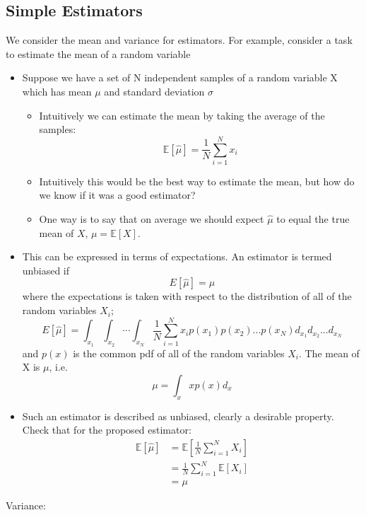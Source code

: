 \documentclass[12pt]{article}
\newcommand{\mexp}{\mathbb{E}}
\begin{document}
\subsection{Simple Estimators}
We consider the mean and variance for estimators. For example, consider a task to estimate the mean of a random variable 
\begin{itemize}
    \item Suppose we have a set of N independent samples of a random variable X which has mean $\mu$ and standard deviation $\sigma$
    \begin{itemize}
        \item Intuitively we can estimate the mean by taking the average of the samples:
        \[
        \mexp[\hat{\mu}] = \frac{1}{N}\sum_{i=1}^N x_i
        \]
        \item Intuitively this would be the best way to estimate the mean, but how do we know if it was a good estimator?
        \item One way is to say that on average we should expect $\hat{\mu}$ to equal the true mean of $X$, $\mu =\mexp[X]$.
    \end{itemize}
    \item This can be expressed in terms of expectations. An estimator is termed unbiased if 
    \[
    E[\hat{\mu}] = \mu
    \]
    where the expectations is taken with respect to the distribution of all of the random variables $X_i$;
    \[
    E[\hat{\mu}] = \int_{x_1}\int_{x_2}\cdots\int_{x_N}\frac{1}{N}\sum_{i=1}^N x_i p(x_1)p(x_2)...p(x_N)d_{x_1}d_{x_2}...d_{x_N}
    \]
    and $p(x)$ is the common pdf of all of the random variables $X_i$. The mean of X is $\mu$, i.e.
    \[
    \mu = \int_x xp(x)d_x
    \]
    \item Such an estimator is described as unbiased, clearly a desirable property. Check that for the proposed estimator:
    \begin{align*}
        \mexp[\hat{\mu}] & = \mexp\left[ \frac{1}{N} \sum_{i=1}^N X_i\right] \\
        & =\frac{1}{N}\sum_{i=1}^N \mexp[X_i] \\
        & = \mu
    \end{align*}
    \end{itemize}
Variance:
\end{document}
